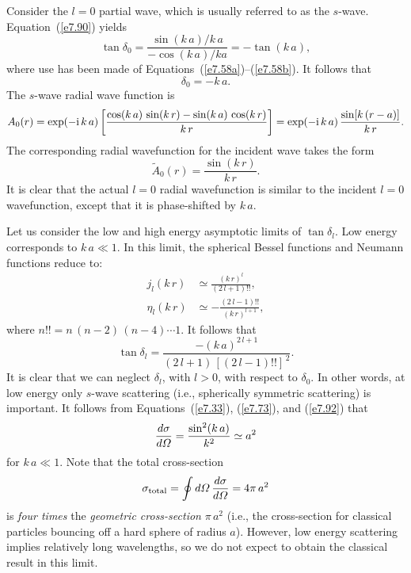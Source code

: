 Consider the $l=0$ partial wave, which is usually referred to as the $s$-wave.
Equation~(\ref{e7.90}) yields
\begin{equation}
\tan\delta_0 = \frac{\sin (k\,a)/k\,a}{-\cos (k\,a)/ka} = -\tan (k\,a),
\end{equation}
where use has been made of Equations~(\ref{e7.58a})--(\ref{e7.58b}). It follows that
\begin{equation}\label{e7.92}
\delta_0 = -k\,a.
\end{equation}
The  $s$-wave radial wave function
is
\begin{equation}
A_0(r) = \exp(-{\rm i}\, k\,a) \left[\frac{\cos (k\,a) \,\sin (k\,r)
-\sin (k\,a) \,\cos( k\,r)}{k\,r}\right]
=\exp(-{\rm i}\, k\,a)\, \frac{ \sin[k\,(r-a)]}{k\,r}.
\end{equation}
The corresponding radial wavefunction for the incident wave 
takes the form
\begin{equation}
\tilde{A}_0(r) = \frac{ \sin (k\,r)}{k\,r}.
\end{equation}
It is clear that the actual $l=0$ radial wavefunction is similar to the
incident $l=0$ wavefunction, except that it is phase-shifted by $k\,a$. 

Let us consider the low and high energy asymptotic limits of $\tan\delta_l$.
Low energy corresponds to $k\,a\ll 1$. In this limit, the spherical Bessel functions
and Neumann functions reduce to:
\begin{align}
j_l(k\,r) &\simeq  \frac{(k\,r)^l}{(2\,l+1)!!},\\[0.5ex]
\eta_l(k\,r) &\simeq  -\frac{(2\,l-1)!!}{(k\,r)^{l+1}},
\end{align}
where $n!! = n\,(n-2)\,(n-4)\cdots 1$. It follows that
\begin{equation}
\tan\delta_l = \frac{-(k\,a)^{2\,l+1}}{(2\,l+1) \,[(2\,l-1)!!]^{\,2}}.
\end{equation}
It is clear that we can neglect  $\delta_l$, with $l>0$, with respect to
$\delta_0$. In other words, at low energy only $s$-wave scattering
({\rm i.e.}, spherically symmetric scattering) is important. It follows
from Equations~(\ref{e7.33}), (\ref{e7.73}), and (\ref{e7.92})  that 
\begin{equation}
\frac{d\sigma}{d{\mit\Omega}} = \frac{\sin^2 (k\,a)}{k^2} \simeq a^2
\end{equation}
for $k\,a\ll 1$. Note that the total cross-section
\begin{equation}
\sigma_{\rm total} = \oint d{\mit\Omega}\,\frac{d\sigma}{d{\mit\Omega}} = 4\pi \,a^2
\end{equation}
is {\em four times}\/ the {\em geometric cross-section}\/ $\pi \,a^2$
({\rm i.e.}, the cross-section for classical particles bouncing off a
hard sphere of radius $a$). 
However, 
low energy scattering implies relatively long wavelengths, so we do not
expect to obtain the  classical result  in this limit. 

